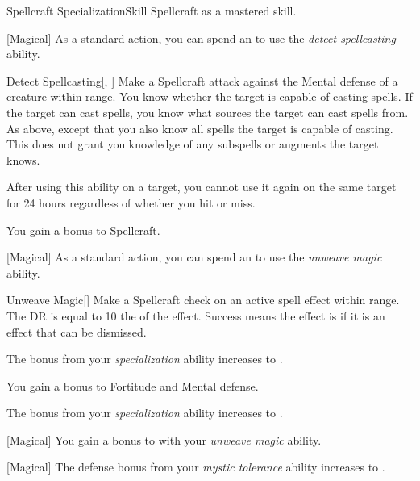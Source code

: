     \begin{feat}{Spellcraft Specialization}{Skill}
        \featpre Spellcraft as a mastered skill.

        [Magical] As a standard action, you can spend an  to use the \textit{detect spellcasting} ability.
        \begin{ability}{Detect Spellcasting}[, ]
            Make a Spellcraft attack against the Mental defense of a creature within \rngmed range.
            \hit You know whether the target is capable of casting spells.
            If the target can cast spells, you know what sources the target can cast spells from.
            \crit As above, except that you also know all spells the target is capable of casting.
            This does not grant you knowledge of any subspells or augments the target knows.

            After using this ability on a target, you cannot use it again on the same target for 24 hours regardless of whether you hit or miss.
        \end{ability}

         You gain a  bonus to Spellcraft.

        [Magical] As a standard action, you can spend an  to use the \textit{unweave magic} ability.
        \begin{ability}{Unweave Magic}[]
            Make a Spellcraft check on an active spell effect within \rngmed range.
            The DR is equal to 10 \add the  of the effect.
            Success means the effect is  if it is an effect that can be dismissed.
        \end{ability}

         The bonus from your \textit{specialization} ability increases to .

         You gain a  bonus to Fortitude and Mental defense.

         The bonus from your \textit{specialization} ability increases to .

        [Magical] You gain a  bonus to  with your \textit{unweave magic} ability.

        [Magical] The defense bonus from your \textit{mystic tolerance} ability increases to .
    \end{feat}

